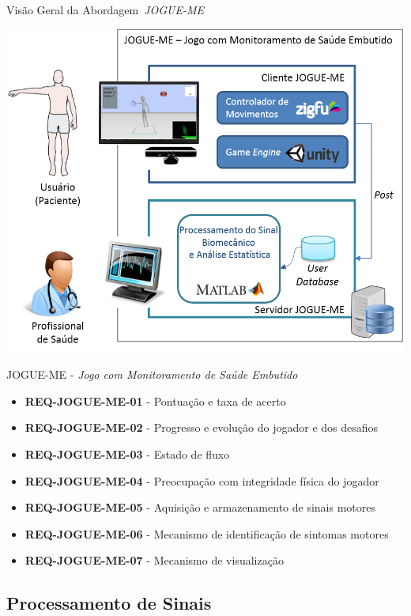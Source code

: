 \documentclass{beamer}
\begin{document}
\begin{frame}{Visão Geral da Abordagem~\textit{JOGUE-ME}}
  \begin{block}{}
      \center \includegraphics[height=2.2 in]{img/visaosistema.png}
  \end{block}
\end{frame}


\begin{frame}{JOGUE-ME - \textit{Jogo com Monitoramento de Saúde Embutido}}
	\begin{block}{}
		\begin{itemize}
			\item	\textbf{REQ-JOGUE-ME-01} - Pontuação e taxa de acerto
			\item	\textbf{REQ-JOGUE-ME-02} - Progresso e evolução do jogador e dos desafios
			\item	\textbf{REQ-JOGUE-ME-03} - Estado de fluxo
			\item	\textbf{REQ-JOGUE-ME-04} - Preocupação com integridade física do jogador
			\item	\textbf{REQ-JOGUE-ME-05} - Aquisição e armazenamento de sinais motores
			\item	\textbf{REQ-JOGUE-ME-06} - Mecanismo de identificação de sintomas motores
			\item	\textbf{REQ-JOGUE-ME-07} - Mecanismo de visualização
		\end{itemize}
	\end{block}
\end{frame}

\subsection{Processamento de Sinais}
\end{document}
